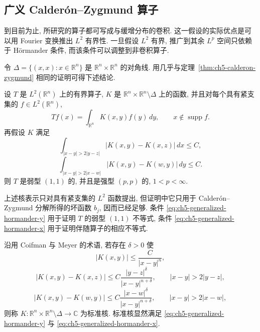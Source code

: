 \subsection{广义 Calderón--Zygmund 算子}
\label{sec:ch5-generalized-calderon-zygmund}

到目前为止, 所研究的算子都可写成与缓增分布的卷积. 这一假设的实际优点是可以用 Fourier 变换推出 $L^2$ 有界性. 一旦假设 $L^2$ 有界, 推广到其余 $L^p$ 空间只依赖于 Hörmander 条件, 而该条件可以调整到非卷积算子.

\hypertarget{chapter-05-page-111}{}
令 $\Delta=\{(x,x):x\in\mathbb R^n\}$ 是 $\mathbb R^n\times\mathbb R^n$ 的对角线. 用几乎与定理~\ref{thm:ch5-calderon-zygmund} 相同的证明可得下述结论.

\begin{Theorem}
\label{thm:ch5-generalized-calderon-zygmund-bounds}
设 $T$ 是 $L^2(\mathbb R^n)$ 上的有界算子, $K$ 是 $\mathbb R^n\times\mathbb R^n\setminus\Delta$ 上的函数, 并且对每个具有紧支集的 $f\in L^2(\mathbb R^n)$,
\[
 Tf(x)=\int_{\mathbb R^n}K(x,y)f(y)\,dy,
 \qquad x\notin\operatorname{supp}f.
\]
再假设 $K$ 满足
\begin{equation}
\label{eq:ch5-generalized-hormander-y}
 \int_{|x-y|>2|y-z|}|K(x,y)-K(x,z)|\,dx\le C,
\end{equation}
\begin{equation}
\label{eq:ch5-generalized-hormander-x}
 \int_{|x-y|>2|x-w|}|K(x,y)-K(w,y)|\,dy\le C.
\end{equation}
则 $T$ 是弱型 $(1,1)$ 的, 并且是强型 $(p,p)$ 的, $1<p<\infty$.
\end{Theorem}

上述核表示只对具有紧支集的 $L^2$ 函数提出, 但证明中它只用于 Calderón--Zygmund 分解所得的坏函数 $b_j$, 因而已经足够. 条件 \eqref{eq:ch5-generalized-hormander-y} 用于证明 $T$ 的弱型 $(1,1)$ 不等式, 条件 \eqref{eq:ch5-generalized-hormander-x} 用于证明伴随算子的相应不等式.

沿用 Coifman 与 Meyer  的术语, 若存在 $\delta>0$ 使
\begin{equation}
\label{eq:ch5-standard-kernel-size}
 |K(x,y)|\le\frac C{|x-y|^n},
\end{equation}
\begin{equation}
\label{eq:ch5-standard-kernel-y-regularity}
 |K(x,y)-K(x,z)|\le C\frac{|y-z|^\delta}{|x-y|^{n+\delta}},
 \qquad |x-y|>2|y-z|,
\end{equation}
\begin{equation}
\label{eq:ch5-standard-kernel-x-regularity}
 |K(x,y)-K(w,y)|\le C\frac{|x-w|^\delta}{|x-y|^{n+\delta}},
 \qquad |x-y|>2|x-w|,
\end{equation}
则称 $K:\mathbb R^n\times\mathbb R^n\setminus\Delta\to\mathbb C$ 为标准核. 标准核显然满足 \eqref{eq:ch5-generalized-hormander-y} 与 \eqref{eq:ch5-generalized-hormander-x}.

